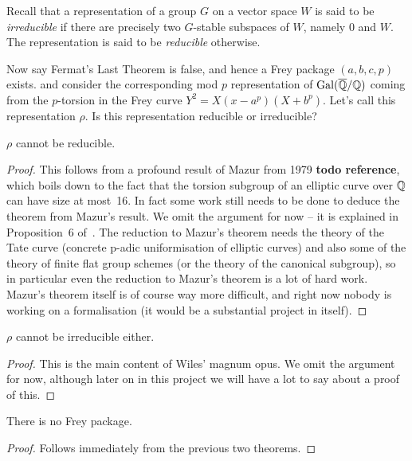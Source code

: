 Recall that a representation of a group $G$ on a vector space $W$ is said to be \emph{irreducible} if there are precisely two $G$-stable subspaces of $W$, namely $0$ and $W$. The representation is said to be \emph{reducible} otherwise.

Now say Fermat's Last Theorem is false, and hence a Frey package $(a,b,c,p)$ exists. and consider the corresponding mod $p$ representation of $\operatorname{Gal}(\overline{\mathbb{Q}}/\mathbb{Q})$ coming from the $p$-torsion in the Frey curve $Y^2=X(x-a^p)(X+b^p)$. Let's call this representation $\rho$. Is this representation reducible or irreducible?

\begin{theorem}[Mazur]\label{Mazur_on_Frey_curve}\leanok $\rho$ cannot be reducible.\end{theorem}
\begin{proof}\tangled This follows from a profound result of Mazur from 1979 {\bf todo reference}, which boils down to the fact that the torsion subgroup of an elliptic curve over $\mathbb{Q}$ can have size at most~16. In fact some work still needs to be done to deduce the theorem from Mazur's result. We omit the argument for now -- it is explained in Proposition~6 of~\cite{serreconj}. The reduction to Mazur's theorem
needs the theory of the Tate curve (concrete p-adic uniformisation of elliptic curves) and also some of the theory of finite flat group schemes (or the theory of the canonical subgroup), so in particular even the reduction to Mazur's theorem is a lot of hard work.
Mazur's theorem itself is of course way more difficult, and right now nobody is working on a formalisation (it would be a substantial
project in itself).
\end{proof}

\begin{theorem}\label{Wiles_on_Frey_curve}\leanok $\rho$ cannot be irreducible either.\end{theorem}
\begin{proof}\tangled This is the main content of Wiles' magnum opus. We omit the argument for now, although later on in this project we will have a lot to say about a proof of this.
\end{proof}

\begin{corollary}\label{no_Frey_package}\leanok There is no Frey package.\end{corollary}
\begin{proof}\leanok Follows immediately from the previous two theorems.\end{proof}

